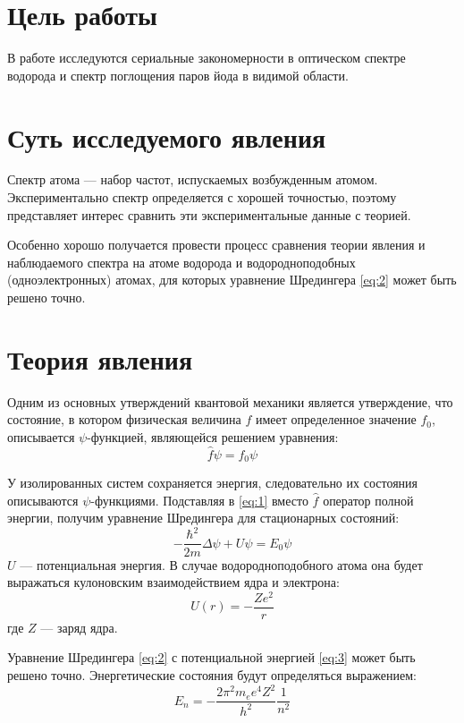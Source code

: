 \documentclass[a4paper, 12pt]{article}
\begin{document}

\section{Цель работы}
В работе исследуются сериальные закономерности в оптическом спектре
водорода и спектр поглощения паров йода в видимой области.

\section{Суть исследуемого явления}

Спектр атома --- набор частот, испускаемых возбужденным атомом.
Экспериментально спектр определяется с хорошей точностью, поэтому
представляет интерес сравнить эти экспериментальные данные с теорией.

Особенно хорошо получается провести процесс сравнения теории явления и
наблюдаемого спектра на атоме водорода и водородноподобных
(одноэлектронных) атомах, для которых уравнение Шредингера \eqref{eq:2}  может быть
решено точно.

\section{Теория явления}
Одним из основных утверждений квантовой механики является утверждение,
что состояние, в котором физическая величина $f$ имеет определенное
значение $f_0$, описывается $\psi$-функцией, являющейся решением
уравнения:
\begin{equation}
    \hat f \psi = f_0 \psi 
    \label{eq:1}
\end{equation}

У изолированных систем сохраняется энергия, следовательно их состояния
описываются $\psi$-функциями. Подставляя в \eqref{eq:1} вместо $\hat
f$ оператор полной энергии, получим уравнение Шредингера для
стационарных состояний:
\begin{equation}
    - \frac{\hbar^2}{2m} \Delta \psi + U \psi = E_0 \psi
    \label{eq:2}
\end{equation}
$U$ --- потенциальная энергия. В случае водородноподобного атома она
будет выражаться кулоновским взаимодействием ядра и электрона:
\begin{equation}
    U (r) = - \frac{Z e^2}{r}
    \label{eq:3}
\end{equation}
где $Z$ --- заряд ядра.

Уравнение Шредингера \eqref{eq:2} с потенциальной энергией
\eqref{eq:3} может быть решено точно. Энергетические состояния будут
определяться выражением:
\begin{equation}
    E_n = - \frac{2 \pi^2 m_e e^4 Z^2}{h^2} \frac{1}{n^2}
    \label{eq:4}
\end{equation}
\end{document}
